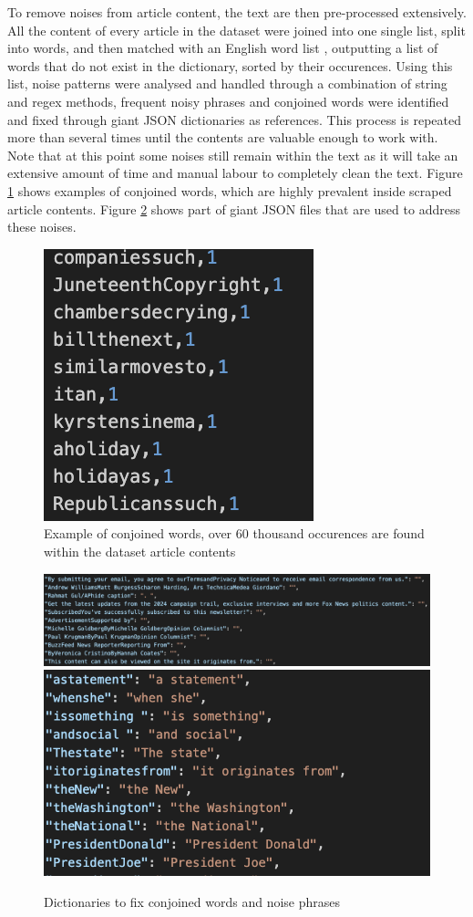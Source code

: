 To remove noises from article content, the text are then pre-processed extensively. All the content of every article in the dataset were joined into one single list, split into words, and then matched with an English word list \cite{dwyl-english-words}, outputting a list of words that do not exist in the dictionary, sorted by their occurences. Using this list, noise patterns were analysed and handled through a combination of string and regex methods, frequent noisy phrases and conjoined words were identified and fixed through giant JSON dictionaries as references. This process is repeated more than several times until the contents are valuable enough to work with. Note that at this point some noises still remain within the text as it will take an extensive amount of time and manual labour to completely clean the text. Figure \ref{fig:conjoined_words} shows examples of conjoined words, which are highly prevalent inside scraped article contents. Figure \ref{fig:dict_fix_examples} shows part of giant JSON files that are used to address these noises.


\begin{figure}[htbp]
    \centering
    \includegraphics[width=0.4\linewidth]{images/conjoined_words_example.png}
    \caption{Example of conjoined words, over 60 thousand occurences are found within the dataset article contents}
    \label{fig:conjoined_words}
\end{figure}

\begin{figure}[htbp]
    \centering
    \includegraphics[width=0.67\linewidth]{images/noise_phrases_example.png}
    \includegraphics[width=0.3\linewidth]{images/word_fix_example.png}
    \caption{Dictionaries to fix conjoined words and noise phrases}
    \label{fig:dict_fix_examples}
\end{figure}


